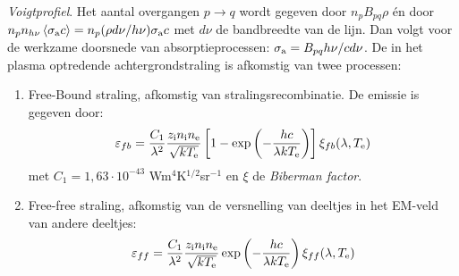 {\it Voigtprofiel}.
\npar
Het aantal overgangen $p\rightarrow q$ wordt gegeven door $n_pB_{pq}\rho$
\'en door $n_pn_{h\nu}\left\langle \sigma_{\rm a} c \right\rangle=n_p(\rho d\nu/h\nu)\sigma_{\rm a}c$
met $d\nu$ de bandbreedte van de lijn. Dan volgt voor de werkzame doorsnede
van absorptieprocessen: $\sigma_{\rm a}=B_{pq}h\nu/cd\nu$.
\npar
De in het plasma optredende achtergrondstraling is afkomstig van twee processen:
\begin{enumerate}
\item Free-Bound straling, afkomstig van stralingsrecombinatie. De emissie is
      gegeven door:
      \[
      \varepsilon_{fb}=\frac{C_1}{\lambda^2}\frac{z_{\rm i}n_{\rm i}n_{\rm e}}{\sqrt{kT_{\rm e}}}\left[1-\exp\left(-\frac{hc}{\lambda kT_{\rm e}}\right)\right]\xi_{fb}(\lambda,T_{\rm e})
      \]
      met $C_1=1,63\cdot10^{-43}$ Wm$^4$K$^{1/2}$sr$^{-1}$ en $\xi$ de
      {\it Biberman factor}.
\item Free-free straling, afkomstig van de versnelling van deeltjes in het
      EM-veld van andere deeltjes:
      \[
      \varepsilon_{ff}=\frac{C_1}{\lambda^2}\frac{z_{\rm i}n_{\rm i}n_{\rm e}}{\sqrt{kT_{\rm e}}}\exp\left(-\frac{hc}{\lambda kT_{\rm e}}\right)\xi_{ff}(\lambda,T_{\rm e})
      \]
\end{enumerate}

